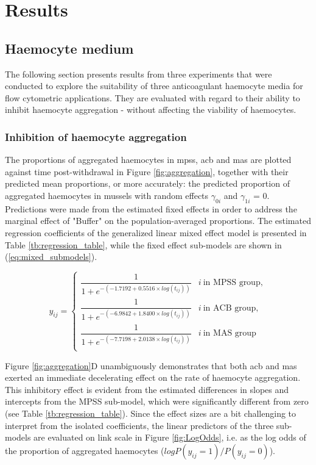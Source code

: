 \chapter{Results}
\label{chap:results_method_development}

\section{Haemocyte medium}
The following section presents results from three experiments that were conducted to explore the suitability of three anticoagulant haemocyte media for flow cytometric applications. They are evaluated with regard to their ability to inhibit haemocyte aggregation - without affecting the viability of haemocytes.

\subsection{Inhibition of haemocyte aggregation}
The proportions of aggregated haemocytes in \acrshort{mpss}, \acrshort{acb} and \acrshort{mas} are plotted against time post-withdrawal in Figure \ref{fig:aggregation}, together with their predicted mean proportions, or more accurately: the predicted proportion of aggregated haemocytes in mussels with random effects $\gamma_{0i}$ and $\gamma_{1i}$ = 0. Predictions were made from the estimated fixed effects in order to address the marginal effect of "Buffer" on the population-averaged proportions. The estimated regression coefficients of the generalized linear mixed effect model is presented in Table \ref{tb:regression_table}, while the fixed effect sub-models are shown in (\ref{eq:mixed_submodels}).

\begin{equation}
    \label{eq:mixed_submodels}
    y_{ij} = \begin{cases}
        \dfrac{1}{1 + e^{-(-1.7192 + 0.5516 \times log(t_{ij}))}}  & i \: \text{in MPSS group}, \\
        \dfrac{1}{1 + e^{-(-6.9842 + 1.8400 \times log(t_{ij}))}}  & i \: \text{in ACB group}, \\
        \dfrac{1}{1 + e^{-(-7.7198 + 2.0138 \times log(t_{ij}))}}  & i \: \text{in MAS group} \\
    \end{cases}
\end{equation}

Figure \ref{fig:aggregation}D unambiguously demonstrates that both \acrshort{acb} and \acrshort{mas} exerted an immediate decelerating effect on the rate of haemocyte aggregation. This inhibitory effect is evident from the estimated differences in slopes and intercepts from the MPSS sub-model, which were significantly different from zero (see Table \ref{tb:regression_table}). Since the effect sizes are a bit challenging to interpret from the isolated coefficients, the linear predictors of the three sub-models are evaluated on link scale in Figure \ref{fig:LogOdds}, i.e. as the log odds of the proportion of aggregated haemocytes ($log P(y_{ij} = 1) / P(y_{ij} = 0)$).

